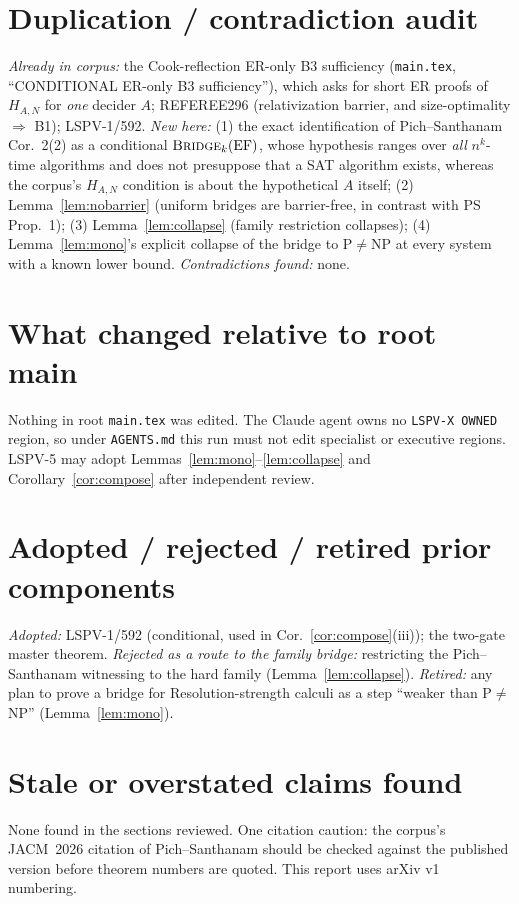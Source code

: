 \documentclass[11pt]{article}
\theoremstyle{definition}
\newcommand{\EF}{\mathrm{EF}}
\begin{document}
\section{Duplication / contradiction audit}
\emph{Already in corpus:} the Cook-reflection ER-only B3 sufficiency (\texttt{main.tex}, ``CONDITIONAL
ER-only B3 sufficiency''), which asks for short ER proofs of $H_{A,N}$ for \emph{one} decider $A$;
REFEREE296 (relativization barrier, and size-optimality $\Rightarrow$ B1); LSPV-1/592.
\emph{New here:} (1) the exact identification of Pich--Santhanam Cor.~2(2) as a conditional
$\textsc{Bridge}_k(\EF)$, whose hypothesis ranges over \emph{all} $n^k$-time algorithms and
does not presuppose that a SAT algorithm exists, whereas the corpus's $H_{A,N}$ condition is
about the hypothetical $A$ itself; (2) Lemma~\ref{lem:nobarrier} (uniform bridges are
barrier-free, in contrast with PS Prop.~1); (3) Lemma~\ref{lem:collapse} (family restriction
collapses); (4) Lemma~\ref{lem:mono}'s explicit collapse of the bridge to P$\ne$NP at every
system with a known lower bound. \emph{Contradictions found:} none.

\section{What changed relative to root main}
Nothing in root \texttt{main.tex} was edited. The Claude agent owns no
\texttt{LSPV-X OWNED} region, so under \texttt{AGENTS.md} this run must not edit specialist or
executive regions. LSPV-5 may adopt Lemmas~\ref{lem:mono}--\ref{lem:collapse} and
Corollary~\ref{cor:compose} after independent review.

\section{Adopted / rejected / retired prior components}
\emph{Adopted:} LSPV-1/592 (conditional, used in Cor.~\ref{cor:compose}(iii)); the two-gate
master theorem. \emph{Rejected as a route to the family bridge:} restricting the
Pich--Santhanam witnessing to the hard family (Lemma~\ref{lem:collapse}).
\emph{Retired:} any plan to prove a bridge for Resolution-strength calculi as a step
``weaker than P$\ne$NP'' (Lemma~\ref{lem:mono}).

\section{Stale or overstated claims found}
None found in the sections reviewed. One citation caution: the corpus's JACM~2026 citation of
Pich--Santhanam should be checked against the published version before theorem numbers are
quoted. This report uses arXiv v1 numbering.
\end{document}
